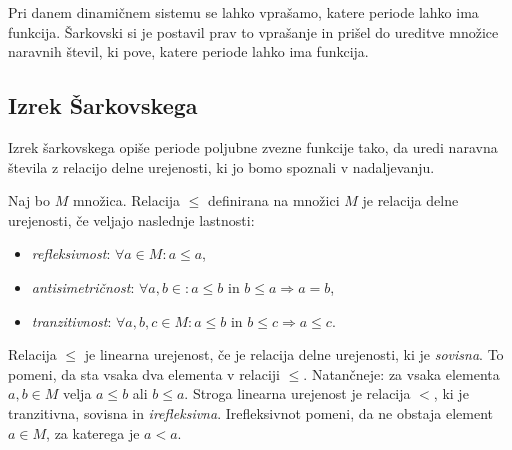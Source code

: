\documentclass[../TG_magistrsko_delo_sections.tex]{subfiles}
\begin{document}
Pri danem dinamičnem sistemu se lahko vprašamo, katere periode lahko ima funkcija. Šarkovski si je postavil prav to vprašanje in prišel do ureditve množice naravnih števil, ki pove, katere periode lahko ima funkcija.

\subsection{Izrek Šarkovskega}
Izrek šarkovskega opiše periode poljubne zvezne funkcije tako, da uredi naravna števila z relacijo delne urejenosti, ki jo bomo spoznali v nadaljevanju.

\begin{definicija}
Naj bo $M$ množica. Relacija $\leq$ definirana na množici $M$ je relacija delne urejenosti, če veljajo naslednje lastnosti:
\begin{itemize}
\item \emph{refleksivnost}: $\forall a \in M : a \leq a$,
\item \emph{antisimetričnost}:  $\forall a, b \in : a \leq b \text{ in } b \leq a \Rightarrow a = b$,
\item \emph{tranzitivnost}: $\forall a, b, c \in M : a \leq b \text{ in } b \leq c \Rightarrow a \leq c$.
\end{itemize}
Relacija $\leq$ je linearna urejenost, če je relacija delne urejenosti, ki je \emph{sovisna}. To pomeni, da sta vsaka dva elementa v relaciji $\leq$. Natančneje: za vsaka elementa $a, b \in M$ velja $a \leq b$ ali $b \leq a$.
Stroga linearna urejenost je relacija $<$, ki je tranzitivna, sovisna in \emph{irefleksivna}. Irefleksivnot pomeni, da ne obstaja element $a \in M$, za katerega je $a<a$.
\end{definicija}
\end{document}
